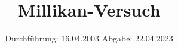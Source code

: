 

\subject{v503}
\title{Millikan-Versuch}
\date{%
  Durchführung: 16.04.2003
  \hspace{3em}
  Abgabe: 22.04.2023
}



\maketitle
\thispagestyle{empty}
\tableofcontents
\newpage






\printbibliography{}

